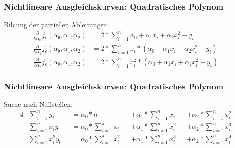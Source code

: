 
\begin{frame}
\frametitle{Nichtlineare Ausgleichskurven: Quadratisches Polynom}

Bildung der partiellen Ableitungen:
\setcounter{equation}{0}
\begin{align}
	\frac{\partial}{\partial \alpha_0} f_{\epsilon}(\alpha_0, \alpha_1, \alpha_2) &= 2 * \sum_{i=1}^{n} \alpha_0 + \alpha_1 x_i + \alpha_2 x_i^2 - y_i \\
	\frac{\partial}{\partial \alpha_1} f_{\epsilon}(\alpha_0, \alpha_1, \alpha_2) &= 2 * \sum_{i=1}^{n} x_i * (\alpha_0 + \alpha_1 x_i + \alpha_2 x_i^2 - y_i) \\
	\frac{\partial}{\partial \alpha_2} f_{\epsilon}(\alpha_0, \alpha_1, \alpha_2) &= 2 * \sum_{i=1}^{n} x_i^2 * (\alpha_0 + \alpha_1 x_i + \alpha_2 x_i^2 - y_i)
\end{align}

\end{frame}


\begin{frame}
\frametitle{Nichtlineare Ausgleichskurven: Quadratisches Polynom}

Suche nach Nullstellen:
\setcounter{equation}{0}
\begin{alignat}{4}
	& \sum_{i=1}^{n} y_i &&= \alpha_0 * n &&+ \alpha_1 * \sum_{i=1}^{n} x_i &&+ \alpha_2 * \sum_{i=1}^{n} x_i^2 \\
	& \sum_{i=1}^{n} x_i y_i &&= \alpha_0 * \sum_{i=1}^{n} x_i &&+ \alpha_1 * \sum_{i=1}^{n} x_i^2 &&+ \alpha_2 * \sum_{i=1}^{n} x_i^3 \\
	& \sum_{i=1}^{n} x_i^2 y_i &&= \alpha_0 * \sum_{i=1}^{n} x_i^2 &&+ \alpha_1 * \sum_{i=1}^{n} x_i^3 &&+ \alpha_2 * \sum_{i=1}^{n} x_i^4
\end{alignat}

\end{frame}


